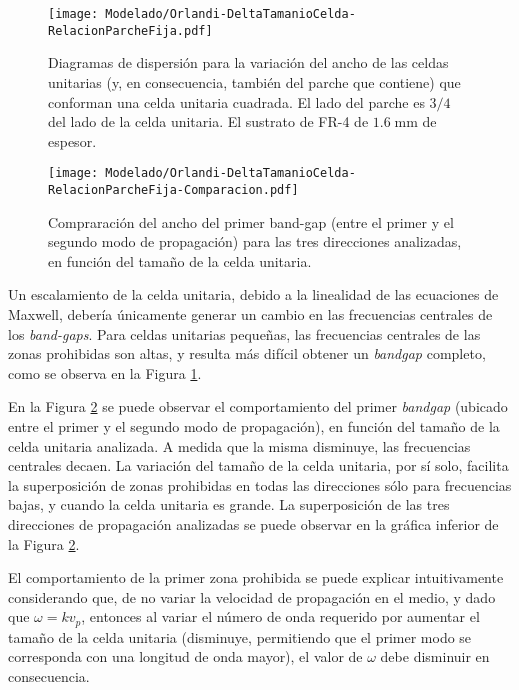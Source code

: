 \begin{figure}[h]
	\centering
	\texttt{[image: Modelado/Orlandi-DeltaTamanioCelda-RelacionParcheFija.pdf]}
	\caption{Diagramas de dispersión para la variación del ancho de las celdas unitarias (y, en consecuencia, también del parche que contiene) que conforman una celda unitaria cuadrada. El lado del parche es $3/4$ del lado de la celda unitaria. El sustrato de FR-4 de $1.6\;\text{mm}$ de espesor.}
	\label{fig:diagdisp-orlandi-variacion-tam-celda-unitaria}
\end{figure}

\begin{figure}[h]
	\centering
	\texttt{[image: Modelado/Orlandi-DeltaTamanioCelda-RelacionParcheFija-Comparacion.pdf]}
	\caption{Compraración del ancho del primer band-gap (entre el primer y el segundo modo de propagación) para las tres direcciones analizadas, en función del tamaño de la celda unitaria.}
	\label{fig:comparacion-diagdisp-orlandi-variacion-tam-celda-unitaria}
\end{figure}

Un escalamiento de la celda unitaria, debido a la linealidad de las ecuaciones de Maxwell, debería únicamente generar un cambio en las frecuencias centrales de los \textit{band-gaps}. Para celdas unitarias pequeñas, las frecuencias centrales de las zonas prohibidas son altas, y resulta más difícil obtener un \textit{bandgap} completo, como se observa en la Figura \ref{fig:diagdisp-orlandi-variacion-tam-celda-unitaria}.

En la Figura \ref{fig:comparacion-diagdisp-orlandi-variacion-tam-celda-unitaria} se puede observar el comportamiento del primer \textit{bandgap} (ubicado entre el primer y el segundo modo de propagación), en función del tamaño de la celda unitaria analizada. A medida que la misma disminuye, las frecuencias centrales decaen. La variación del tamaño de la celda unitaria, por sí solo, facilita la superposición de zonas prohibidas en todas las direcciones sólo para frecuencias bajas, y cuando la celda unitaria es grande. La superposición de las tres direcciones de propagación analizadas se puede observar en la gráfica inferior de la Figura \ref{fig:comparacion-diagdisp-orlandi-variacion-tam-celda-unitaria}.

El comportamiento de la primer zona prohibida se puede explicar intuitivamente considerando que, de no variar la velocidad de propagación en el medio, y dado que $\omega =k v_p$, entonces al variar el número de onda requerido por aumentar el tamaño de la celda unitaria (disminuye, permitiendo que el primer modo se corresponda con una longitud de onda mayor), el valor de $\omega$ debe disminuir en consecuencia.

